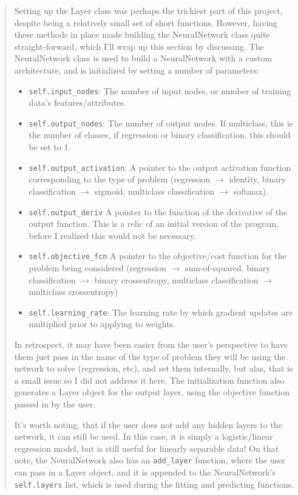 \documentclass{article}
\begin{document}
\begin{quote}
Setting up the Layer class was perhaps the trickiest part of this project, despite being a relatively small set of short functions. However, having these methods in place made building the NeuralNetwork class quite straight-forward, which I'll wrap up this section by discussing. The NeuralNetwork class is used to build a NeuralNetwork with a custom architecture, and is initialized by setting a number of parameters:

\begin{itemize}
	\item [] \texttt{self.input\_nodes}: The number of input nodes, or number of training data's features/attributes.
	\item []  \texttt{self.output\_nodes}: The number of output nodes. If multiclass, this is the number of classes, if regression or binary classification, this should be set to 1.
	\item [] \texttt{self.output\_activation}: A pointer to the output activation function corresponding to the type of problem (regression $\longrightarrow$ identity, binary classification $\longrightarrow$ sigmoid, multiclass classification $\longrightarrow$ softmax).
	\item [] \texttt{self.output\_deriv} A pointer to the function of the derivative of the output function. This is a relic of an initial version of the program, before I realized this would not be necessary. 
	\item [] \texttt{self.objective\_fcn} A pointer to the objective/cost function for the problem being considered (regression $\longrightarrow$ sum-of-squared, binary classification $\longrightarrow$ binary crossentropy, multiclass classification $\longrightarrow$ multiclass crossentropy)
	\item []  \texttt{self.learning\_rate}: The learning rate by which gradient updates are multiplied prior to applying to weights.
\end{itemize}

In retrospect, it may have been easier from the user's perspective to have them just pass in the name of the type of problem they will be using the network to solve (regression, etc), and set them internally, but alas, that is a small issue so I did not address it here. The initialization function also generates a Layer object for the output layer, using the objective function passed in by the user. 

It's worth noting, that if the user does not add any hidden layers to the network, it can still be used. In this case, it is simply a logistic/linear regression model, but is still useful for linearly separable data! On that note, the NeuralNetwork also has an \texttt{add\_layer} function, where the user can pass in a Layer object, and it is appended to the NeuralNetwork's \texttt{self.layers} list, which is used during the fitting and predicting functions.


\end{quote}
\end{document}
